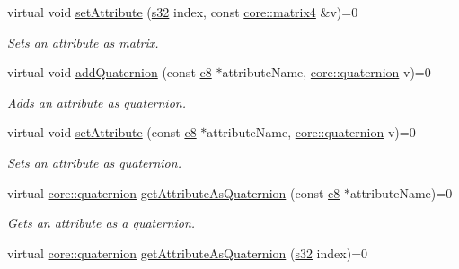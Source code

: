 \begin{DoxyCompactItemize}
\mbox{\label{classirr_1_1io_1_1IAttributes_ae25f3ab5a4e8a8f27f4678c07b16e021}} 
virtual void \hyperlink{classirr_1_1io_1_1IAttributes_ae25f3ab5a4e8a8f27f4678c07b16e021}{set\+Attribute} (\hyperlink{namespaceirr_ac66849b7a6ed16e30ebede579f9b47c6}{s32} index, const \hyperlink{namespaceirr_1_1core_a4c9d4e29899535971052810954a14431}{core\+::matrix4} \&v)=0
\begin{DoxyCompactList}\small\item\em Sets an attribute as matrix. \end{DoxyCompactList}\item 
\mbox{\label{classirr_1_1io_1_1IAttributes_af502127e96f12c3d4dc506455e586acc}} 
virtual void \hyperlink{classirr_1_1io_1_1IAttributes_af502127e96f12c3d4dc506455e586acc}{add\+Quaternion} (const \hyperlink{namespaceirr_a9395eaea339bcb546b319e9c96bf7410}{c8} $\ast$attribute\+Name, \hyperlink{classirr_1_1core_1_1quaternion}{core\+::quaternion} v)=0
\begin{DoxyCompactList}\small\item\em Adds an attribute as quaternion. \end{DoxyCompactList}\item 
\mbox{\label{classirr_1_1io_1_1IAttributes_a12488b48428edb2b0979f42a5cc6377a}} 
virtual void \hyperlink{classirr_1_1io_1_1IAttributes_a12488b48428edb2b0979f42a5cc6377a}{set\+Attribute} (const \hyperlink{namespaceirr_a9395eaea339bcb546b319e9c96bf7410}{c8} $\ast$attribute\+Name, \hyperlink{classirr_1_1core_1_1quaternion}{core\+::quaternion} v)=0
\begin{DoxyCompactList}\small\item\em Sets an attribute as quaternion. \end{DoxyCompactList}\item 
virtual \hyperlink{classirr_1_1core_1_1quaternion}{core\+::quaternion} \hyperlink{classirr_1_1io_1_1IAttributes_a59248466d3f3ea2d7930876e577b222d}{get\+Attribute\+As\+Quaternion} (const \hyperlink{namespaceirr_a9395eaea339bcb546b319e9c96bf7410}{c8} $\ast$attribute\+Name)=0
\begin{DoxyCompactList}\small\item\em Gets an attribute as a quaternion. \end{DoxyCompactList}\item 
virtual \hyperlink{classirr_1_1core_1_1quaternion}{core\+::quaternion} \hyperlink{classirr_1_1io_1_1IAttributes_aee7cc16cae259af9cbdd37bfc9956a5f}{get\+Attribute\+As\+Quaternion} (\hyperlink{namespaceirr_ac66849b7a6ed16e30ebede579f9b47c6}{s32} index)=0

\end{DoxyCompactItemize}
